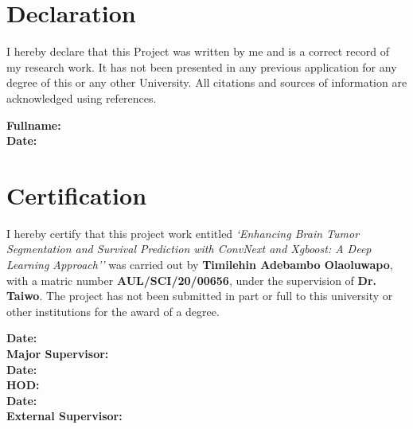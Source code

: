 \documentclass[12pt,oneside]{report}
\begin{document}
\chapter*{Declaration}

I hereby declare that this Project was written by me and is a correct record of my research work. It has not been presented in any previous application for any degree of this or any other University. All citations and sources of information are acknowledged using references.

\vspace{2cm} %

\begin{flushleft}
    \textbf{Fullname:} \underline{\hspace{6cm}} \\ %
    \vspace{1cm}
    \textbf{Date:} \underline{\hspace{6cm}} %
\end{flushleft}

\chapter*{Certification}

I hereby certify that this project work entitled \textit{`Enhancing Brain Tumor Segmentation and Survival Prediction with ConvNext and Xgboost: A Deep Learning Approach''} was carried out by \textbf{Timilehin Adebambo Olaoluwapo}, with a matric number \textbf{AUL/SCI/20/00656}, under the supervision of \textbf{Dr. Taiwo}. The project has not been submitted in part or full to this university or other institutions for the award of a degree.

\vspace{2cm} %

\begin{flushleft}
    \underline{\hspace{4cm}} \hspace{3cm} \quad \textbf{Date:} \underline{\hspace{3cm}} \\
    \textbf{Major Supervisor:} \\
    \vspace{1cm}
    \underline{\hspace{4cm}}  \hspace{3cm} \quad \textbf{Date:} \underline{\hspace{3cm}} \\
    \textbf{HOD:} \\
    \vspace{1cm}
    \underline{\hspace{4cm}}  \hspace{3cm} \quad \textbf{Date:} \underline{\hspace{3cm}} \\
    \textbf{External Supervisor:} \\
    \vspace{1cm}
\end{flushleft}
\end{document}
